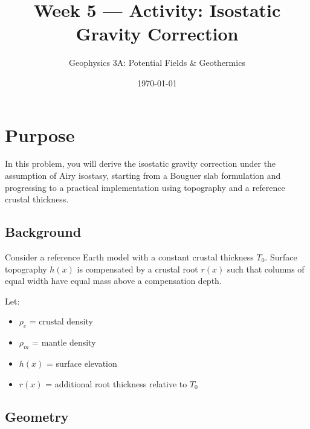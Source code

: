 \documentclass[11pt,a4paper]{article}
\title{Week 5 --- Activity: Isostatic Gravity Correction}
\author{Geophysics 3A: Potential Fields \& Geothermics}
\date{\today}
\begin{document}
\maketitle

\section*{Purpose}

In this problem, you will derive the isostatic gravity correction under the assumption of Airy isostasy, starting from a Bouguer slab formulation and progressing to a practical implementation using topography and a reference crustal thickness.

\subsection*{Background}

Consider a reference Earth model with a constant crustal thickness $T_0$. Surface topography $h(x)$ is compensated by a crustal root $r(x)$ such that columns of equal width have equal mass above a compensation depth.

Let:
\begin{itemize}
    \item $\rho_c$ = crustal density
    \item $\rho_m$ = mantle density
    \item $h(x)$ = surface elevation
    \item $r(x)$ = additional root thickness relative to $T_0$
\end{itemize}

\subsection*{Geometry}
\end{document}

